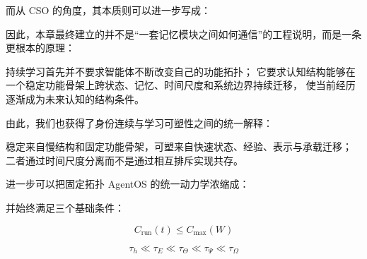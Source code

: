而从 CSO 的角度，其本质则可以进一步写成：

\begin{statementbox}
\centering
{}
\end{statementbox}

因此，本章最终建立的并不是“一套记忆模块之间如何通信”的工程说明，而是一条更根本的原理：

\begin{statementbox}
持续学习首先并不要求智能体不断改变自己的功能拓扑；
它要求认知结构能够在一个稳定功能骨架上跨状态、记忆、时间尺度和系统边界持续迁移，
使当前经历逐渐成为未来认知的结构条件。
\end{statementbox}

由此，我们也获得了身份连续与学习可塑性之间的统一解释：

\begin{statementbox}
稳定来自慢结构和固定功能骨架，可塑来自快速状态、经验、表示与承载迁移；
二者通过时间尺度分离而不是通过相互排斥实现共存。
\end{statementbox}

进一步可以把固定拓扑 AgentOS 的统一动力学浓缩成：

\begin{statementbox}
\centering
{}
\end{statementbox}

并始终满足三个基础条件：

\[
\boxed{
C_{\mathrm{run}}(t)
\leq
C_{\max}(W)
}
\]

\[
\boxed{
\tau_h
\ll
\tau_E
\ll
\tau_\Theta
\ll
\tau_\Psi
\ll
\tau_\Omega
}
\]


